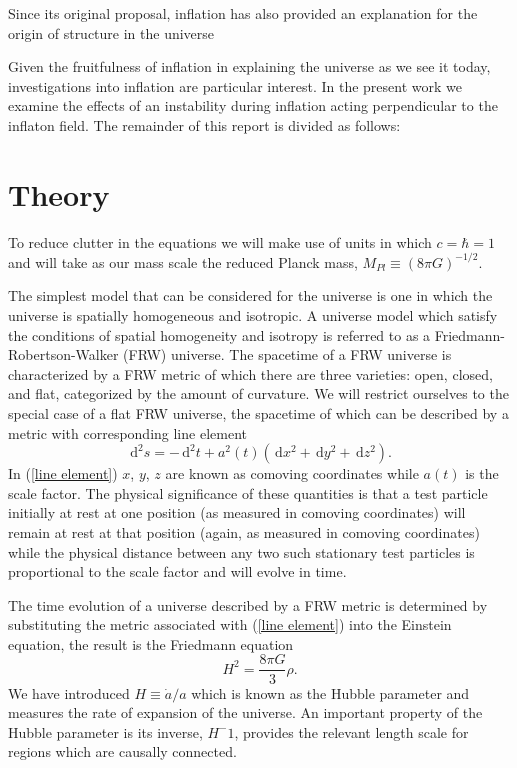\documentclass[letterpaper,11pt]{article}
\newcommand{\ud}{\,\mathrm{d}}
\begin{document}
Since its original proposal, inflation has also provided an explanation for the origin of structure in the universe %

Given the fruitfulness of inflation in explaining the universe as we see it today, investigations into inflation are particular interest. In the present work we examine the effects of an instability during inflation acting perpendicular to the inflaton field. The remainder of this report is divided as follows:

\section{Theory}
To reduce clutter in the equations we will make use of units in which $c=\hbar=1$ and will take as our mass scale the reduced Planck mass, $M_{Pl}\equiv (8\pi G)^{-1/2}$.

The simplest model that can be considered for the universe is one in which the universe is spatially homogeneous and isotropic. A universe model which satisfy the conditions of spatial homogeneity and isotropy is referred to as a Friedmann-Robertson-Walker (FRW) universe. The spacetime of a FRW universe is characterized by a FRW metric of which there are three varieties: open, closed, and flat, categorized by the amount of curvature. We will restrict ourselves to the special case of a flat FRW universe, the spacetime of which can be described by a metric with corresponding line element
\begin{equation}
\ud^2s=-\ud^2t+a^2(t)(\ud x^2+\ud y^2+\ud z^2). \label{line element}
\end{equation}
In (\ref{line element}) $x$, $y$, $z$ are known as comoving coordinates while $a(t)$ is the scale factor. The physical significance of these quantities is that a test particle initially at rest at one position (as measured in comoving coordinates) will remain at rest at that position (again, as measured in comoving coordinates) while the physical distance between any two such stationary test particles is proportional to the scale factor and will evolve in time.

The time evolution of a universe described by a FRW metric is determined by substituting the metric associated with (\ref{line element}) into the Einstein equation, the result is the Friedmann equation
\begin{equation}
H^2=\frac{8\pi G}{3}\rho. \label{fried eqn}
\end{equation}
We have introduced $H\equiv \dot{a}/a$ which is known as the Hubble parameter and measures the rate of expansion of the universe. An important property of the Hubble parameter is its inverse, $H^-1$, provides the relevant length scale for regions which are causally connected.%
\end{document}
